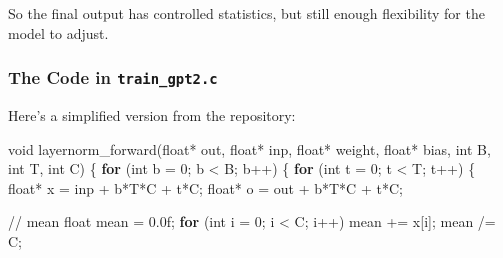 \documentclass[
  letterpaper,
  DIV=11,
  numbers=noendperiod]{scrreprt}
\newenvironment{Shaded}{\begin{snugshade}}{\end{snugshade}}
\newcommand{\BuiltInTok}[1]{\textcolor[rgb]{0.00,0.23,0.31}{#1}}
\newcommand{\CommentTok}[1]{\textcolor[rgb]{0.37,0.37,0.37}{#1}}
\newcommand{\ControlFlowTok}[1]{\textcolor[rgb]{0.00,0.23,0.31}{\textbf{#1}}}
\newcommand{\DataTypeTok}[1]{\textcolor[rgb]{0.68,0.00,0.00}{#1}}
\newcommand{\DecValTok}[1]{\textcolor[rgb]{0.68,0.00,0.00}{#1}}
\newcommand{\FloatTok}[1]{\textcolor[rgb]{0.68,0.00,0.00}{#1}}
\newcommand{\NormalTok}[1]{\textcolor[rgb]{0.00,0.23,0.31}{#1}}
\newcommand{\OperatorTok}[1]{\textcolor[rgb]{0.37,0.37,0.37}{#1}}
\begin{document}
So the final output has controlled statistics, but still enough
flexibility for the model to adjust.

\subsubsection{\texorpdfstring{The Code in
\texttt{train\_gpt2.c}}{The Code in train\_gpt2.c}}\label{the-code-in-train_gpt2.c}

Here's a simplified version from the repository:

\begin{Shaded}
\begin{Highlighting}[]
\DataTypeTok{void}\NormalTok{ layernorm\_forward}\OperatorTok{(}\DataTypeTok{float}\OperatorTok{*}\NormalTok{ out}\OperatorTok{,} \DataTypeTok{float}\OperatorTok{*}\NormalTok{ inp}\OperatorTok{,} \DataTypeTok{float}\OperatorTok{*}\NormalTok{ weight}\OperatorTok{,} \DataTypeTok{float}\OperatorTok{*}\NormalTok{ bias}\OperatorTok{,} \DataTypeTok{int}\NormalTok{ B}\OperatorTok{,} \DataTypeTok{int}\NormalTok{ T}\OperatorTok{,} \DataTypeTok{int}\NormalTok{ C}\OperatorTok{)} \OperatorTok{\{}
    \ControlFlowTok{for} \OperatorTok{(}\DataTypeTok{int}\NormalTok{ b }\OperatorTok{=} \DecValTok{0}\OperatorTok{;}\NormalTok{ b }\OperatorTok{\textless{}}\NormalTok{ B}\OperatorTok{;}\NormalTok{ b}\OperatorTok{++)} \OperatorTok{\{}
        \ControlFlowTok{for} \OperatorTok{(}\DataTypeTok{int}\NormalTok{ t }\OperatorTok{=} \DecValTok{0}\OperatorTok{;}\NormalTok{ t }\OperatorTok{\textless{}}\NormalTok{ T}\OperatorTok{;}\NormalTok{ t}\OperatorTok{++)} \OperatorTok{\{}
            \DataTypeTok{float}\OperatorTok{*}\NormalTok{ x }\OperatorTok{=}\NormalTok{ inp }\OperatorTok{+}\NormalTok{ b}\OperatorTok{*}\NormalTok{T}\OperatorTok{*}\NormalTok{C }\OperatorTok{+}\NormalTok{ t}\OperatorTok{*}\NormalTok{C}\OperatorTok{;}
            \DataTypeTok{float}\OperatorTok{*}\NormalTok{ o }\OperatorTok{=}\NormalTok{ out }\OperatorTok{+}\NormalTok{ b}\OperatorTok{*}\NormalTok{T}\OperatorTok{*}\NormalTok{C }\OperatorTok{+}\NormalTok{ t}\OperatorTok{*}\NormalTok{C}\OperatorTok{;}

            \CommentTok{// mean}
            \DataTypeTok{float}\NormalTok{ mean }\OperatorTok{=} \FloatTok{0.0}\BuiltInTok{f}\OperatorTok{;}
            \ControlFlowTok{for} \OperatorTok{(}\DataTypeTok{int}\NormalTok{ i }\OperatorTok{=} \DecValTok{0}\OperatorTok{;}\NormalTok{ i }\OperatorTok{\textless{}}\NormalTok{ C}\OperatorTok{;}\NormalTok{ i}\OperatorTok{++)}\NormalTok{ mean }\OperatorTok{+=}\NormalTok{ x}\OperatorTok{[}\NormalTok{i}\OperatorTok{];}
\NormalTok{            mean }\OperatorTok{/=}\NormalTok{ C}\OperatorTok{;}


\end{Highlighting}
\end{Shaded}
\end{document}
